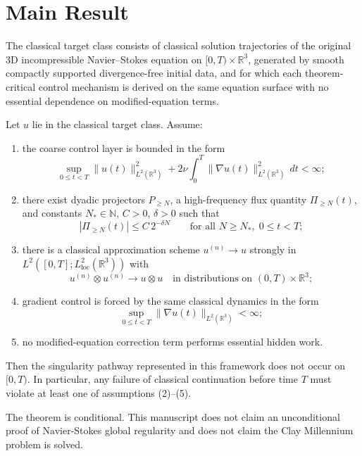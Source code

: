 \section{Main Result}

\begin{definition}
The classical target class consists of classical solution trajectories of the original 3D incompressible Navier--Stokes equation on \([0,T)\times\mathbb{R}^3\), generated by smooth compactly supported divergence-free initial data, and for which each theorem-critical control mechanism is derived on the same equation surface with no essential dependence on modified-equation terms.
\end{definition}

\begin{theorem}
Let \(u\) lie in the classical target class. Assume:
\begin{enumerate}[leftmargin=*]
\item the coarse control layer is bounded in the form
  \[
  \sup_{0\le t<T}\|u(t)\|_{L^2(\mathbb{R}^3)}^2
  + 2\nu\int_0^T \|\nabla u(t)\|_{L^2(\mathbb{R}^3)}^2\,dt < \infty;
  \]
\item there exist dyadic projectors \(P_{\ge N}\), a high-frequency flux quantity \(\Pi_{\ge N}(t)\), and constants \(N_\ast\in\mathbb{N}\), \(C>0\), \(\delta>0\) such that
  \[
  |\Pi_{\ge N}(t)| \le C\,2^{-\delta N}
  \qquad\text{for all } N\ge N_\ast,\; 0\le t<T;
  \]
\item there is a classical approximation scheme \(u^{(n)}\to u\) strongly in \(L^2([0,T];L^2_{\mathrm{loc}}(\mathbb{R}^3))\) with
  \[
  u^{(n)}\otimes u^{(n)} \to u\otimes u
  \quad\text{in distributions on } (0,T)\times\mathbb{R}^3;
  \]
\item gradient control is forced by the same classical dynamics in the form
  \[
  \sup_{0\le t<T}\|\nabla u(t)\|_{L^2(\mathbb{R}^3)} < \infty;
  \]
\item no modified-equation correction term performs essential hidden work.
\end{enumerate}
Then the singularity pathway represented in this framework does not occur on \([0,T)\). In particular, any failure of classical continuation before time \(T\) must violate at least one of assumptions (2)--(5).
\end{theorem}

\begin{remark}
The theorem is conditional. This manuscript does not claim an unconditional proof of Navier-Stokes global regularity and does not claim the Clay Millennium problem is solved.
\end{remark}

